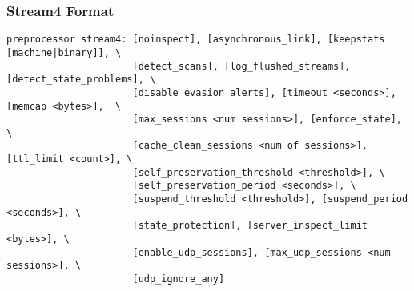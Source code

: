 \documentclass[english]{report}
\begin{document}
\subsubsection{Stream4 Format}

\begin{verbatim}
preprocessor stream4: [noinspect], [asynchronous_link], [keepstats [machine|binary]], \
                      [detect_scans], [log_flushed_streams], [detect_state_problems], \
                      [disable_evasion_alerts], [timeout <seconds>], [memcap <bytes>],  \
                      [max_sessions <num sessions>], [enforce_state], \
                      [cache_clean_sessions <num of sessions>], [ttl_limit <count>], \
                      [self_preservation_threshold <threshold>], \
                      [self_preservation_period <seconds>], \
                      [suspend_threshold <threshold>], [suspend_period <seconds>], \
                      [state_protection], [server_inspect_limit <bytes>], \
                      [enable_udp_sessions], [max_udp_sessions <num sessions>], \
                      [udp_ignore_any]
\end{verbatim}
\end{document}
